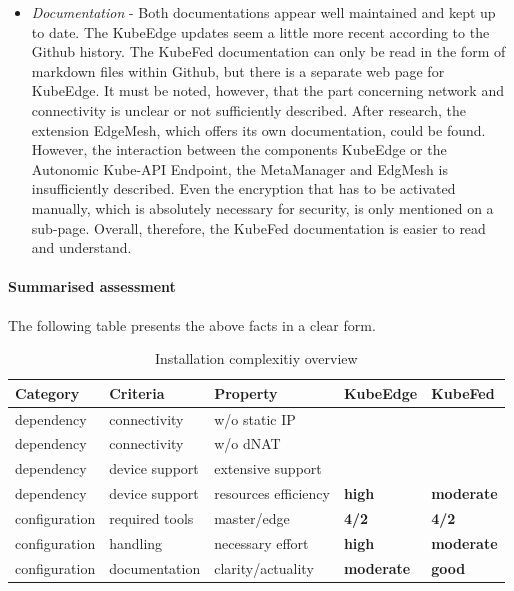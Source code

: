 \documentclass[MIC,Master,english]{twbook}%
\newcommand{\cmark}{\ding{51}}%
\newcommand{\xmark}{\ding{55}}%
\begin{document}
\begin{itemize}
    \item \textit{Documentation} - Both documentations appear well maintained and kept up to date. The KubeEdge updates seem a little more recent according to the Github history. The KubeFed documentation can only be read in the form of markdown files within Github, but there is a separate web page for KubeEdge. It must be noted, however, that the part concerning network and connectivity is unclear or not sufficiently described. After research, the extension EdgeMesh, which offers its own documentation, could be found. However, the interaction between the components KubeEdge or the Autonomic Kube-API Endpoint, the MetaManager and EdgMesh is insufficiently described. Even the encryption that has to be activated manually, which is absolutely necessary for security, is only mentioned on a sub-page. Overall, therefore, the KubeFed documentation is easier to read and understand.
\end{itemize}

\paragraph{Summarised assessment} The following table presents the above facts in a clear form. 
\begin{table}[ht]
    \begin{center}
        \begin{tabular}{|l|l|l|l|l|}
            \hline
            Category & Criteria & Property & \textbf{KubeEdge} & \textbf{KubeFed} \\
            \hline
            dependency & connectivity & w/o static \ac{IP} & \cmark & \xmark \\
            dependency & connectivity & w/o dNAT & \cmark & \xmark \\
            dependency & device support & extensive support & \cmark & \cmark \\
            dependency & device support & resources efficiency & \textbf{high} & \textbf{moderate} 
            \\
            configuration & required tools & master/edge & \textbf{4/2} & \textbf{4/2} \\
            configuration & handling & necessary effort & \textbf{high} & \textbf{moderate} \\
            configuration & documentation & clarity/actuality & \textbf{moderate} & \textbf{good} \\
            \hline
        \end{tabular}
        \caption{Installation complexitiy overview}
        \label{tab:install-overview}
    \end{center}
\end{table}
\end{document}
